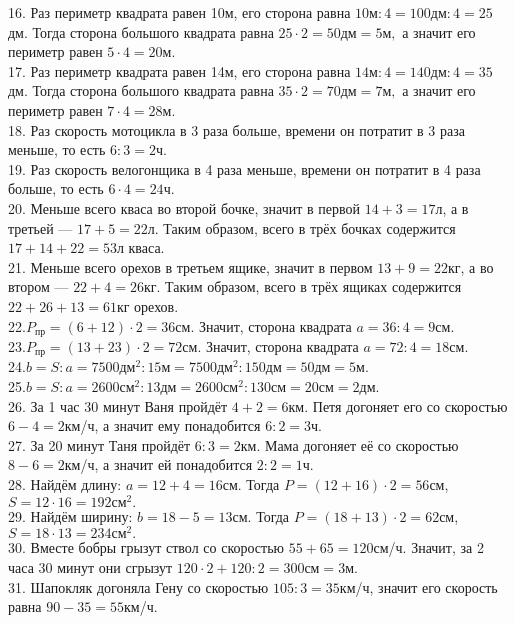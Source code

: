 16. Раз периметр квадрата равен 10м, его сторона равна $10\text{м}:4=100\text{дм}:4=25$дм. Тогда сторона большого квадрата равна $25\cdot2=50\text{дм}=5\text{м},$ а значит его периметр равен $5\cdot4=20$м.\\
17. Раз периметр квадрата равен 14м, его сторона равна $14\text{м}:4=140\text{дм}:4=35$дм. Тогда сторона большого квадрата равна $35\cdot2=70\text{дм}=7\text{м},$ а значит его периметр равен $7\cdot4=28$м.\\
18. Раз скорость мотоцикла в 3 раза больше, времени он потратит в 3 раза меньше, то есть $6:3=2$ч.\\
19. Раз скорость велогонщика в 4 раза меньше, времени он потратит в 4 раза больше, то есть $6\cdot4=24$ч.\\
20. Меньше всего кваса во второй бочке, значит в первой $14+3=17$л, а в третьей --- $17+5=22$л. Таким образом, всего в трёх бочках содержится $17+14+22=53$л кваса.\\
21. Меньше всего орехов в третьем ящике, значит в первом $13+9=22$кг, а во втором --- $22+4=26$кг. Таким образом, всего в трёх ящиках содержится $22+26+13=61$кг орехов.\\
22.$P_{\text{пр}}=(6+12)\cdot2=36$см. Значит, сторона квадрата $a=36:4=9$см.\\
23.$P_{\text{пр}}=(13+23)\cdot2=72$см. Значит, сторона квадрата $a=72:4=18$см.\\
24.$b=S:a=7500\text{дм}^2:15\text{м}=7500\text{дм}^2:150\text{дм}=50\text{дм}=5$м.\\
25.$b=S:a=2600\text{см}^2:13\text{дм}=2600\text{см}^2:130\text{см}=20\text{см}=2$дм.\\
26. За 1 час 30 минут Ваня пройдёт $4+2=6$км. Петя догоняет его со скоростью $6-4=2$км/ч, а значит ему понадобится $6:2=3$ч.\\
27. За 20 минут Таня пройдёт $6:3=2$км. Мама догоняет её со скоростью $8-6=2$км/ч, а значит ей понадобится $2:2=1$ч.\\
28. Найдём длину: $a=12+4=16$см. Тогда $P=(12+16)\cdot2=56$см, $S=12\cdot16=192\text{см}^2.$\\
29. Найдём ширину: $b=18-5=13$см. Тогда $P=(18+13)\cdot2=62$см, $S=18\cdot13=234\text{см}^2.$\\
30. Вместе бобры грызут ствол со скоростью $55+65=120$см/ч. Значит, за 2 часа 30 минут они сгрызут $120\cdot2+120:2=300\text{см}=3$м.\\
31. Шапокляк догоняла Гену со скоростью $105:3=35$км/ч, значит его скорость равна $90-35=55$км/ч.\\
